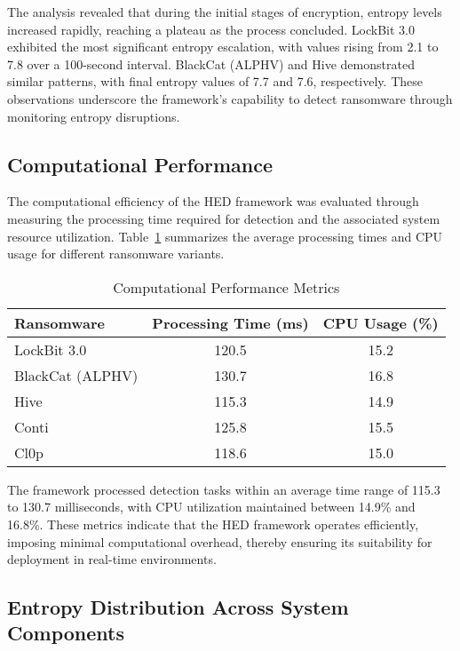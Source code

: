 \documentclass[lettersize,journal]{IEEEtran}
\begin{document}
The analysis revealed that during the initial stages of encryption, entropy levels increased rapidly, reaching a plateau as the process concluded. LockBit 3.0 exhibited the most significant entropy escalation, with values rising from 2.1 to 7.8 over a 100-second interval. BlackCat (ALPHV) and Hive demonstrated similar patterns, with final entropy values of 7.7 and 7.6, respectively. These observations underscore the framework's capability to detect ransomware through monitoring entropy disruptions.

\subsection{Computational Performance}

The computational efficiency of the HED framework was evaluated through measuring the processing time required for detection and the associated system resource utilization. Table~\ref{tab:comp_performance} summarizes the average processing times and CPU usage for different ransomware variants.

\begin{table}[h]
	\centering
	\caption{Computational Performance Metrics}
	\label{tab:comp_performance}
	\begin{tabular}{|l|c|c|}
		\hline
		\textbf{Ransomware} & \textbf{Processing Time (ms)} & \textbf{CPU Usage (\%)} \\
		\hline
		LockBit 3.0 & 120.5 & 15.2 \\
		BlackCat (ALPHV) & 130.7 & 16.8 \\
		Hive & 115.3 & 14.9 \\
		Conti & 125.8 & 15.5 \\
		Cl0p & 118.6 & 15.0 \\
		\hline
	\end{tabular}
\end{table}

The framework processed detection tasks within an average time range of 115.3 to 130.7 milliseconds, with CPU utilization maintained between 14.9\% and 16.8\%. These metrics indicate that the HED framework operates efficiently, imposing minimal computational overhead, thereby ensuring its suitability for deployment in real-time environments.

\subsection{Entropy Distribution Across System Components}
\end{document}
